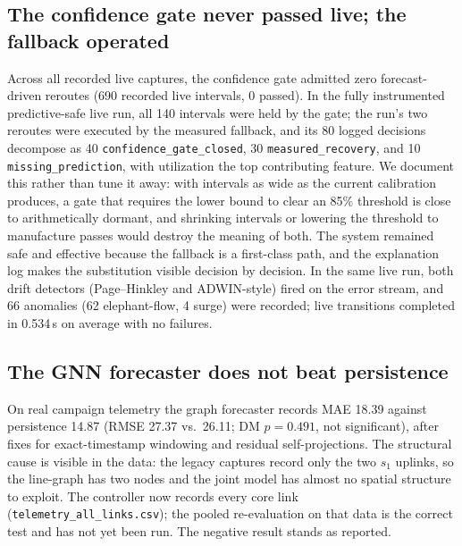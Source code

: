 \documentclass[conference]{IEEEtran}
\begin{document}
\subsection{The confidence gate never passed live; the fallback operated}
\label{sec:gate}
Across all recorded live captures, the confidence gate admitted zero
forecast-driven reroutes (690 recorded live intervals, 0 passed). In
the fully instrumented predictive-safe live run, all 140 intervals
were held by the gate; the run's two reroutes were executed by the
measured fallback, and its 80 logged decisions decompose as 40
\texttt{confidence\_gate\_closed}, 30 \texttt{measured\_recovery},
and 10 \texttt{missing\_prediction}, with utilization the top
contributing feature. We document this rather than tune it away:
with intervals as wide as the current calibration produces, a gate
that requires the lower bound to clear an 85\% threshold is close to
arithmetically dormant, and shrinking intervals or lowering the
threshold to manufacture passes would destroy the meaning of both.
The system remained safe and effective because the fallback is a
first-class path, and the explanation log makes the substitution
visible decision by decision. In the same live run, both drift
detectors (Page--Hinkley and ADWIN-style) fired on the error stream,
and 66 anomalies (62 elephant-flow, 4 surge) were recorded; live
transitions completed in 0.534\,s on average with no failures.

\subsection{The GNN forecaster does not beat persistence}
\label{sec:gnn}
On real campaign telemetry the graph forecaster records MAE 18.39
against persistence 14.87 (RMSE 27.37 vs.\ 26.11; DM $p = 0.491$, not
significant), after fixes for exact-timestamp windowing and residual
self-projections. The structural cause is visible in the data: the
legacy captures record only the two $s_1$ uplinks, so the line-graph
has two nodes and the joint model has almost no spatial structure to
exploit. The controller now records every core link
(\texttt{telemetry\_all\_links.csv}); the pooled re-evaluation on
that data is the correct test and has not yet been run. The negative
result stands as reported.

\end{document}
